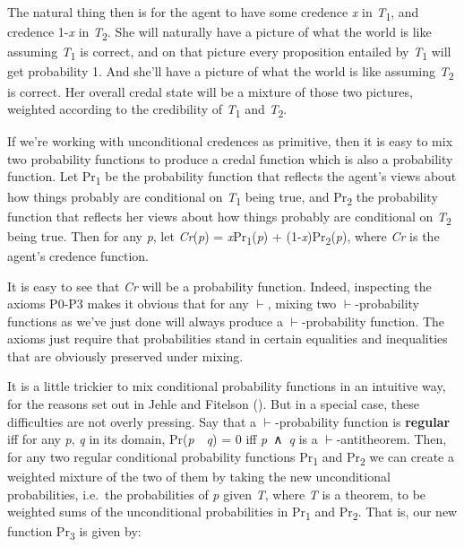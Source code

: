 \documentclass[
  10pt,
  letterpaper,
  DIV=11,
  numbers=noendperiod,
  twoside]{scrartcl}
\begin{document}
The natural thing then is for the agent to have some credence \emph{x}
in \emph{T}\textsubscript{1}, and credence 1-\emph{x} in
\emph{T}\textsubscript{2}. She will naturally have a picture of what the
world is like assuming \emph{T}\textsubscript{1} is correct, and on that
picture every proposition entailed by \emph{T}\textsubscript{1} will get
probability 1. And she'll have a picture of what the world is like
assuming \emph{T}\textsubscript{2} is correct. Her overall credal state
will be a mixture of those two pictures, weighted according to the
credibility of \emph{T}\textsubscript{1} and \emph{T}\textsubscript{2}.

If we're working with unconditional credences as primitive, then it is
easy to mix two probability functions to produce a credal function which
is also a probability function. Let Pr\textsubscript{1} be the
probability function that reflects the agent's views about how things
probably are conditional on \emph{T}\textsubscript{1} being true, and
Pr\textsubscript{2} the probability function that reflects her views
about how things probably are conditional on \emph{T}\textsubscript{2}
being true. Then for any \emph{p}, let \emph{Cr}(\emph{p}) =
\emph{x}Pr\textsubscript{1}(\emph{p}) +
(1-\emph{x})Pr\textsubscript{2}(\emph{p}), where \emph{Cr} is the
agent's credence function.

It is easy to see that \emph{Cr} will be a probability function. Indeed,
inspecting the axioms P0-P3 makes it obvious that for any \(\vdash\),
mixing two \(\vdash\)-probability functions as we've just done will
always produce a \(\vdash\)-probability function. The axioms just
require that probabilities stand in certain equalities and inequalities
that are obviously preserved under mixing.

It is a little trickier to mix conditional probability functions in an
intuitive way, for the reasons set out in Jehle and Fitelson
(). But in a special case, these
difficulties are not overly pressing. Say that a \(\vdash\)-probability
function is \textbf{regular} iff for any \emph{p}, \emph{q} in its
domain, Pr(\emph{p}~\textbar~\emph{q}) = 0 iff \emph{p}~∧~\emph{q} is a
\(\vdash\)-antitheorem. Then, for any two regular conditional
probability functions Pr\textsubscript{1} and Pr\textsubscript{2} we can
create a weighted mixture of the two of them by taking the new
unconditional probabilities, i.e.~the probabilities of \emph{p} given
\emph{T}, where \emph{T} is a theorem, to be weighted sums of the
unconditional probabilities in Pr\textsubscript{1} and
Pr\textsubscript{2}. That is, our new function Pr\textsubscript{3} is
given by:
\end{document}

